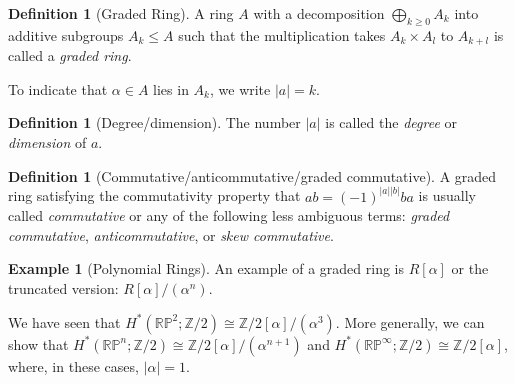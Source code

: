 \documentclass[reqno]{amsart}
\theoremstyle{definition}
\newtheorem{definition}[theorem]{Definition}
\newtheorem{example}[theorem]{Example}
\theoremstyle{remark}
\begin{document}
    \begin{definition}[Graded Ring]
        A ring $A$ with a decomposition
        $\bigoplus_{k\ge 0}A_k$  into additive
        subgroups $A_k \le A$ such that the
        multiplication takes
        $A_k \times A_l$ to $A_{k+l}$ is called
        a \textit{graded ring}.
    \end{definition}

    To indicate that $\alpha \in A$ lies
    in $A_k$, we write
    $\left| a \right| = k$.

    \begin{definition}[Degree/dimension]
        The number $\left| a \right| $ 
        is called the \textit{degree} or 
        \textit{dimension} of $a$.
    \end{definition}

    \begin{definition}[Commutative/anticommutative/graded commutative]
        A graded ring satisfying the commutativity
        property that
        $ab = (-1)^{\left| a \right| \left| b \right| } ba$ 
        is usually called \textit{commutative} or any of
        the following less ambiguous terms:
        \textit{graded commutative},
        \textit{anticommutative}, or 
        \textit{skew commutative}.
    \end{definition}

    \begin{example}[Polynomial Rings]
        An example of a graded ring is
        $R \left[ \alpha \right] $ or
        the truncated version: $R \left[ \alpha \right] /
        \left( \alpha^n \right) $.

        We have seen that
        $H^{*}\left( \mathbb{R}\mathbb{P}^{2}; \mathbb{Z}/2 \right) 
        \cong \mathbb{Z}/2 \left[ \alpha \right] /
        \left( \alpha^{3} \right) $.
        More generally, we can show that
        $H^{*}\left( \mathbb{R}\mathbb{P}^{n};
        \mathbb{Z}/2\right) \cong
        \mathbb{Z}/2 \left[ \alpha \right] /
        \left( \alpha^{n+1} \right) $ and
        $H^{*}\left( \mathbb{R}\mathbb{P}^{\infty};
        \mathbb{Z}/2\right) \cong
        \mathbb{Z}/2 \left[ \alpha \right] $, where,
        in these cases, $\left| \alpha \right| = 1$.
    \end{example}
\end{document}
